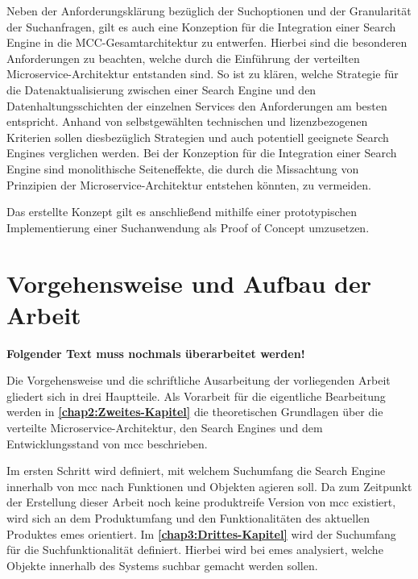 
Neben der Anforderungsklärung bezüglich der Suchoptionen und der Granularität der Suchanfragen, gilt es auch eine Konzeption für die Integration einer Search Engine in die MCC-Gesamtarchitektur zu entwerfen. Hierbei sind die besonderen Anforderungen zu beachten, welche durch die Einführung der verteilten Microservice-Architektur entstanden sind. So ist zu klären, welche Strategie für die Datenaktualisierung zwischen einer Search Engine und den Datenhaltungsschichten der einzelnen Services den Anforderungen am besten entspricht. Anhand von selbstgewählten technischen und lizenzbezogenen Kriterien sollen diesbezüglich Strategien und auch potentiell geeignete Search Engines verglichen werden. Bei der Konzeption für die Integration einer Search Engine sind monolithische Seiteneffekte, die durch die Missachtung von Prinzipien der Microservice-Architektur entstehen könnten, zu vermeiden.

Das erstellte Konzept gilt es anschließend mithilfe einer prototypischen Implementierung einer Suchanwendung als \glqq Proof of Concept\grqq{} umzusetzen.

\section{Vorgehensweise und Aufbau der Arbeit\label{sec1.3:Unterpunkt-3}}

\textbf{Folgender Text muss nochmals überarbeitet werden!}

Die Vorgehensweise und die schriftliche Ausarbeitung der vorliegenden Arbeit gliedert sich in drei Hauptteile. Als Vorarbeit für die eigentliche Bearbeitung werden in \textbf{\autoref{chap2:Zweites-Kapitel}} die theoretischen Grundlagen über die verteilte Microservice-Architektur, den Search Engines und dem Entwicklungsstand von \gls{mcc} beschrieben.

Im ersten Schritt wird definiert, mit welchem Suchumfang die Search Engine innerhalb von \gls{mcc} nach Funktionen und Objekten agieren soll. Da zum Zeitpunkt der Erstellung dieser Arbeit noch keine produktreife Version von \gls{mcc} existiert, wird sich an dem Produktumfang und den Funktionalitäten des aktuellen Produktes \gls{emes} orientiert. Im \textbf{\autoref{chap3:Drittes-Kapitel}} wird der Suchumfang für die Suchfunktionalität definiert. Hierbei wird bei \gls{emes} analysiert, welche Objekte innerhalb des Systems \glqq suchbar\grqq{} gemacht werden sollen.

